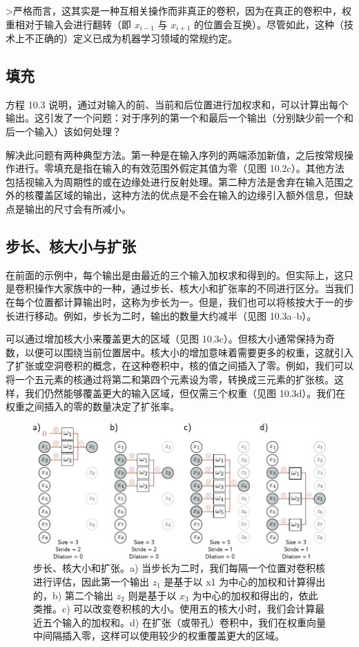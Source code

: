 \documentclass[lang=cn,newtx,10pt,scheme=chinese]{elegantbook}
\begin{document}
>严格而言，这其实是一种互相关操作而非真正的卷积，因为在真正的卷积中，权重相对于输入会进行翻转（即 \(x_{i-1}\) 与 \(x_{i+1}\) 的位置会互换）。尽管如此，这种（技术上不正确的）定义已成为机器学习领域的常规约定。
\subsection{填充}
方程 10.3 说明，通过对输入的前、当前和后位置进行加权求和，可以计算出每个输出。这引发了一个问题：对于序列的第一个和最后一个输出（分别缺少前一个和后一个输入）该如何处理？

解决此问题有两种典型方法。第一种是在输入序列的两端添加新值，之后按常规操作进行。零填充是指在输入的有效范围外假定其值为零（见图 10.2c）。其他方法包括视输入为周期性的或在边缘处进行反射处理。第二种方法是舍弃在输入范围之外的核覆盖区域的输出，这种方法的优点是不会在输入的边缘引入额外信息，但缺点是输出的尺寸会有所减小。

\subsection{步长、核大小与扩张}
在前面的示例中，每个输出是由最近的三个输入加权求和得到的。但实际上，这只是卷积操作大家族中的一种，通过步长、核大小和扩张率的不同进行区分。当我们在每个位置都计算输出时，这称为步长为一。但是，我们也可以将核按大于一的步长进行移动。例如，步长为二时，输出的数量大约减半（见图 10.3a–b）。

可以通过增加核大小来覆盖更大的区域（见图 10.3c）。但核大小通常保持为奇数，以便可以围绕当前位置居中。核大小的增加意味着需要更多的权重，这就引入了扩张或空洞卷积的概念，在这种卷积中，核的值之间插入了零。例如，我们可以将一个五元素的核通过将第二和第四个元素设为零，转换成三元素的扩张核。这样，我们仍然能够覆盖更大的输入区域，但仅需三个权重（见图 10.3d）。我们在权重之间插入的零的数量决定了扩张率。


\begin{figure}[ht!]
\centering
\includegraphics[width=0.7\linewidth]{PDFFigures/UDLChap10PDF/Conv1a.pdf}
\caption{步长、核大小和扩张。a) 当步长为二时，我们每隔一个位置对卷积核进行评估，因此第一个输出 \(z_1\) 是基于以 x1 为中心的加权和计算得出的，b) 第二个输出 \(z_2\) 则是基于以 \(x_3\) 为中心的加权和得出的，依此类推。c) 可以改变卷积核的大小。使用五的核大小时，我们会计算最近五个输入的加权和。d) 在扩张（或带孔）卷积中，我们在权重向量中间隔插入零，这样可以使用较少的权重覆盖更大的区域。}
\end{figure}
\end{document}
